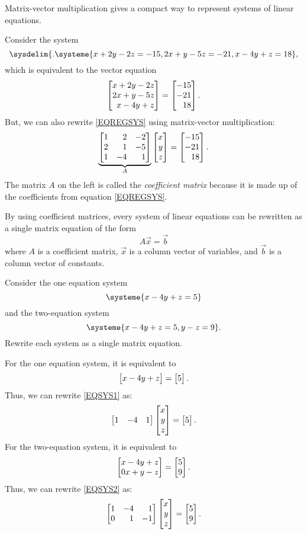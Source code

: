 Matrix-vector multiplication gives a compact way to represent systems of linear equations.

Consider the system
\begin{equation}
	\label{EQREGSYS}
	\sysdelim\{.
		\systeme{
			x+2y-2z=-15,
			2x+y-5z=-21,
			x-4y+z=18
		},
\end{equation}
which is equivalent to the vector equation
\[
	\mat{x+2y-2z\\
           2x+y-5z\\
	     x-4y+z}=\mat{-15\\-21\\18}.
\]
But, we can also rewrite \eqref{EQREGSYS} using matrix-vector multiplication:
\[
	\underbrace{\mat{1&2&-2\\2&1&-5\\1&-4&1}}_{A}\mat{x\\y\\z}=\mat{-15\\-21\\18}.
\]
The matrix $A$ on the left is called the \emph{coefficient matrix} because it
is made up of the coefficients from equation \eqref{EQREGSYS}.

By using coefficient matrices, every system of linear equations can be rewritten as a single matrix equation
of the form
\[
	A\vec x=\vec b
\]
where $A$ is a coefficient matrix, $\vec x$ is a column vector of variables, and $\vec b$ 
is a column vector of constants.

\begin{example}
	Consider the one equation system
	\begin{equation}
		\label{EQSYS1}
		\systeme{x-4y+z=5}
	\end{equation}
	and the two-equation system
	\begin{equation}
		\label{EQSYS2}
		\systeme{x-4y+z=5, y-z=9}.
	\end{equation}
	Rewrite each system as a single matrix equation.

	For the one equation system, it is equivalent to
	\[
	    \mat{x-4y+z}=\mat{5}.
	\]
	Thus, we can rewrite \eqref{EQSYS1} as:
	\[
	    \mat{1&-4&1}\mat{x\\y\\z}=\mat{5}.
	\]
	For the two-equation system, it is equivalent to
	\[
	     \mat{x-4y+z\\0x+y-z}=\mat{5\\9}.
	\]
	Thus, we can rewrite \eqref{EQSYS2} as:
	\[
	    \mat{1&-4&1\\0&1&-1}\mat{x\\y\\z}=\mat{5\\9}.
	\]
\end{example}

